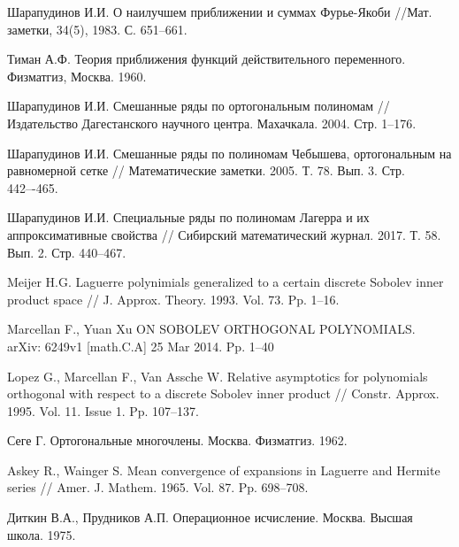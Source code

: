 \begin{thebibliography}{99}
{Шарапудинов И.И.}
О наилучшем приближении и суммах Фурье-Якоби
//Мат. заметки, 34(5), 1983. С. 651--661.



{Тиман А.Ф.} Теория приближения функций действительного переменного. Физматгиз, Москва. 1960.



{Шарапудинов И.И.}
Смешанные ряды по ортогональным полиномам // Издательство Дагестанского научного центра. Махачкала. 2004. Стр. 1--176.



{Шарапудинов И.И.}
Смешанные ряды по полиномам Чебышева, ортогональным на равномерной сетке // Математические заметки. 2005. Т. 78. Вып. 3. Стр. 442–-465.



{Шарапудинов И.И.}
Специальные ряды по полиномам Лагерра и их аппроксимативные свойства // Сибирский математический журнал. 2017. Т. 58. Вып. 2. Стр. 440--467.



{Meijer H.G.}
Laguerre polynimials generalized to a certain discrete Sobolev inner product space // J. Approx. Theory. 1993. Vol. 73. Pp. 1--16.



{Marcellan F., Yuan Xu}
ON SOBOLEV ORTHOGONAL POLYNOMIALS. arXiv: 6249v1 [math.C.A] 25 Mar 2014. Pp. 1--40



{Lopez G., Marcellan F., Van Assche W.}
Relative asymptotics for polynomials orthogonal with respect to a discrete Sobolev inner product // Constr. Approx. 1995. Vol. 11. Issue 1. Pp. 107--137.



{Сеге Г.}
Ортогональные многочлены. Москва. Физматгиз. 1962.



{Askey R., Wainger S.}
Mean convergence of expansions in Laguerre and Hermite series // Amer. J. Mathem. 1965. Vol. 87. Pp. 698--708.



{Диткин В.А., Прудников А.П.}
Операционное исчисление. Москва. Высшая школа. 1975.




\end{thebibliography}
